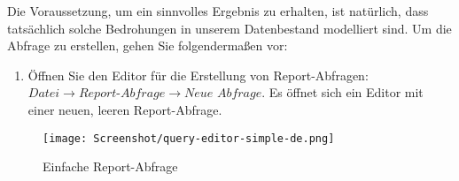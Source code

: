\documentclass[a4paper,10pt]{book}
\providecommand{\tightlist}{%
  \setlength{\itemsep}{0pt}\setlength{\parskip}{0pt}}
\begin{document}
Die Voraussetzung, um ein sinnvolles Ergebnis zu erhalten, ist natürlich, dass
tatsächlich solche Bedrohungen in unserem Datenbestand modelliert sind. Um die
Abfrage zu erstellen, gehen Sie folgendermaßen vor:

\begin{enumerate}
\def\labelenumi{\arabic{enumi}.}
\tightlist
\item
  Öffnen Sie den Editor für die Erstellung von Report-Abfragen:
  $\textit{Datei}\to\textit{Report-Abfrage}\to\textit{Neue Abfrage}$. Es öffnet
  sich ein Editor mit einer neuen, leeren Report-Abfrage.
\end{enumerate}

\begin{figure}[htb!]
  \centering
  \texttt{[image: Screenshot/query-editor-simple-de.png]}
  \caption{Einfache Report-Abfrage}
  \label{fig:einfache-report-abfrage}
\end{figure}
\end{document}
